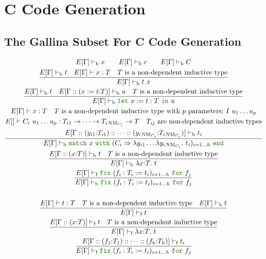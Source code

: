 \documentclass[a4paper,fleqn]{article}
\def\gallina{\textrm{Gallina}}
\newcommand{\kwlet}{\mbox{\color{mygreen}\ttfamily let}}
\newcommand{\kwin}{\mbox{\color{mygreen}\ttfamily in}}
\newcommand{\kwmatch}{\mbox{\color{mygreen}\ttfamily match}}
\newcommand{\kwwith}{\mbox{\color{mygreen}\ttfamily with}}
\newcommand{\kwend}{\mbox{\color{mygreen}\ttfamily end}}
\newcommand{\kwfix}{\mbox{\color{mygreen}\ttfamily fix}}
\newcommand{\kwfor}{\mbox{\color{mygreen}\ttfamily for}}
\newcommand{\lamT}[3]{\lambda #1\mathord{:}#2.~#3}
\newcommand{\lamB}[1]{\lambda #1.~}
\newcommand{\lassum}[2]{(#1\mathord{:}#2)}
\newcommand{\ldef}[3]{(#1:=#2\mathord{:}#3)}
\newcommand{\letin}[3]{\kwlet~#1:=#2~\kwin~#3}
\newcommand{\match}[4]{\kwmatch~#1~\kwwith~(#2 \Rightarrow #3)_{#4}~\kwend}
\newcommand{\fix}[4]{\kwfix~(#1 := #2)_{#3}~\kwfor~#4}
\DeclareMathOperator{\NM}{NM}
\newcommand{\vdashb}{\vdash_{\textrm{b}}}
\newcommand{\vdashf}{\vdash_{\textrm{f}}}
\begin{document}
\section{C Code Generation}\label{sec:c-code-gen}
\subsection{The \gallina{} Subset For C Code Generation}\label{sec:gallinasubsetforcgen}
\raggedright
\begin{gather*}
  E[\Gamma] \vdashb x \qquad
  E[\Gamma] \vdashb c \qquad
  E[\Gamma] \vdashb C \\
  \dfrac{
    E[\Gamma] \vdashb t \quad
    E[\Gamma] \vdash x : T \quad
    \text{$T$ is a non-dependent inductive type}
  }{
    E[\Gamma] \vdashb t~x
  } \\
  \dfrac{
    E[\Gamma] \vdashb t \quad
    E[\Gamma::\ldef{x}{t}{T}] \vdashb u \quad
    \text{$T$ is a non-dependent inductive type}
  }{
    E[\Gamma] \vdashb \letin{x}{t:T}{u}
  } \\
  \dfrac{
    \begin{gathered}
      E[\Gamma] \vdash x:T \quad
      \text{$T$ is a non-dependent inductive type with $p$ parameters:}~I~u_1\dots u_p \\
      E[] \vdash C_i~u_1\dots u_p: T_{i1} \rightarrow \dots \rightarrow T_{i\NM_{C_i}} \rightarrow T \quad
      \text{$T_{ij}$ are non-dependent inductive types} \\
      E[\Gamma::\lassum{y_{i1}}{T_{i1}}::\dots::\lassum{y_{i\NM_{C_i}}}{T_{i\NM_{C_i}}}] \vdashb t_i
    \end{gathered}
  }{
    E[\Gamma] \vdashb \match{x}{C_i}{\lambda y_{i1}\dots\lamB{y_{i\NM_{C_i}}}t_i}{i=1\dots h}
  } \\
  \dfrac{
    E[\Gamma::\lassum{x}{T}] \vdashb t \quad
    \text{$T$ is a non-dependent inductive type}
  }{
    E[\Gamma] \vdashb \lamT{x}{T}{t}
  } \\
  \dfrac{
    E[\Gamma] \vdashf \fix{f_i:T_i}{t_i}{i=1\dots h}{f_j}
  }{
    E[\Gamma] \vdashb \fix{f_i:T_i}{t_i}{i=1\dots h}{f_j}
  } \\
  \\
  \dfrac{
    E[\Gamma] \vdash t : T \quad
    \text{$T$ is a non-dependent inductive type} \quad
    E[\Gamma] \vdashb t
  }{
    E[\Gamma] \vdashf t
  } \\
  \dfrac{
    E[\Gamma::\lassum{x}{T}] \vdashf t \quad
    \text{$T$ is a non-dependent inductive type}
  }{
    E[\Gamma] \vdashf \lamT{x}{T}{t}
  } \\
  \dfrac{
    E[\Gamma::\lassum{f_1}{T_1}::\dots::\lassum{f_h}{T_h}] \vdashf t_i
  }{
    E[\Gamma] \vdashf \fix{f_i:T_i}{t_i}{i=1\dots h}{f_j}
  }
\end{gather*}
\end{document}
